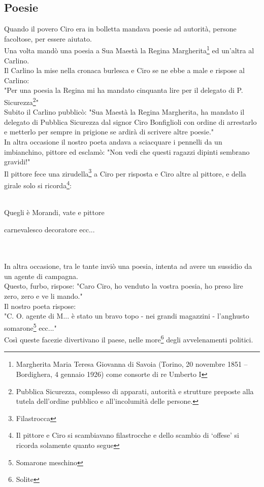 \documentclass[10pt]{memoir} %
\begin{document}
\subsection{Poesie}
Quando il povero Ciro era in bolletta mandava poesie ad autorità, persone facoltose, per essere aiutato.\\
Una volta mandò una poesia a Sua Maestà la Regina Margherita\footnote{Margherita Maria Teresa Giovanna di Savoia (Torino, 20 novembre 1851 – Bordighera, 4 gennaio 1926) come consorte di re Umberto I} ed un'altra al Carlino.\\
Il Carlino la mise nella cronaca burlesca e Ciro se ne ebbe a male e rispose al Carlino:\\
"Per una poesia la Regina mi ha mandato cinquanta lire per il delegato di P. Sicurezza\footnote{Pubblica Sicurezza, complesso di apparati, autorità e strutture preposte alla tutela dell'ordine pubblico e all'incolumità delle persone.}"\\
Subito il Carlino pubblicò: "Sua Maestà la Regina Margherita, ha mandato il delegato di Pubblica Sicurezza dal signor Ciro Bonfiglioli con ordine di arrestarlo e metterlo per sempre in prigione se ardirà di scrivere altre poesie."\\
In altra occasione il nostro poeta andava a sciacquare i pennelli da un imbianchino, pittore ed esclamò: "Non vedi che questi ragazzi dipinti sembrano gravidi!"\\
Il pittore fece una zirudella\footnote{Filastrocca} a Ciro per risposta e Ciro altre al pittore, e della girale solo si ricorda\footnote{Il pittore e Ciro si scambiavano filastrocche e dello scambio di ‘offese' si ricorda solamente quanto segue}:\\\\
\textcal \Huge
	\centerline{Quegli è Morandi, vate e pittore}
	\centerline{carnevalesco decoratore ecc...} 
\normalfont \normalsize
\\\\
In altra occasione, tra le tante inviò una poesia, intenta ad avere un sussidio da un agente di campagna. \\
Questo, furbo, rispose: "Caro Ciro, ho venduto la vostra poesia, ho preso lire zero, zero e ve li mando."\\
Il nostro poeta rispose:\\
"C. O. agente di M... è stato un bravo topo - nei grandi magazzini - l'anghusto somarone\footnote{Somarone meschino} ecc..."\\
Così queste facezie divertivano il paese, nelle more\footnote{Solite} degli avvelenamenti politici. 
\end{document}
